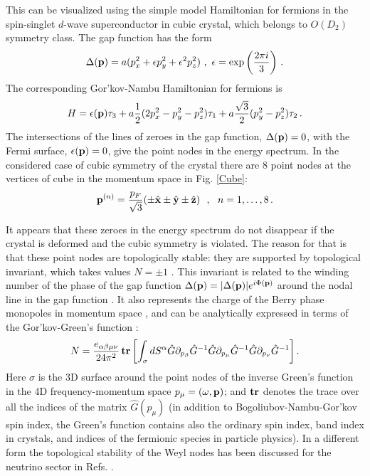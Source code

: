 \documentclass[prb,
superscriptaddress,showpacs,amsmath,amssymb]{revtex4}
\begin{document}
This can be visualized using the
simple model Hamiltonian for fermions  in the  spin-singlet $d$-wave superconductor in cubic crystal, which belongs to $O(D_2)$ symmetry class. The gap function has the form
 \begin{equation}
\Delta({\bf p})= a(p_x^2 +\epsilon p_y^2 +\epsilon^2 p_z^2) \,\,,
 \,\,\epsilon=\exp\left(\frac{2\pi i}{3} \right)\,.
\label{OD2}
\end{equation}
The corresponding Gor'kov-Nambu Hamiltonian for fermions is
 \begin{equation}
 H=\epsilon({\bf p})\tau_3 +  a\frac{1}{2}(2p_x^2 -p_y^2-p_z^2)\tau_1 + a\frac{\sqrt{3}}{2}(p_y^2-p_z^2)\tau_2 \,.
\label{Hamiltonian}
\end{equation}
The intersections of the lines of zeroes in the gap function, $\Delta({\bf p})=0$, with the Fermi surface, $\epsilon({\bf p})=0$, give the point nodes in the energy spectrum. In the considered case of cubic symmetry of the crystal there are  8 point nodes at the vertices of cube in the momentum space in Fig. \ref{Cube}:
 \begin{equation}
{\bf p}^{(n)}=\frac{p_F}{\sqrt{3}}( \pm \hat{\bf x} \pm \hat{\bf y}   \pm \hat{\bf z} )~~,~~n=1, \ldots,8\,.
\label{Nodes}
\end{equation}

It appears that these zeroes in the energy spectrum do not disappear if the crystal is deformed and the cubic symmetry is violated. The reason for that is that these point nodes are topologically stable: they are supported by topological invariant, which takes values $N=\pm 1$ \cite{VolovikGorkov1985}. This invariant is related to the winding number of the phase of the gap function $\Delta({\bf p})=|\Delta({\bf p})|e^{i\Phi({\bf p})}$ around the nodal line in the gap function \cite{VolovikMineev1982}. It also represents the charge of the Berry phase monopoles in momentum space \cite{Volovik1987}, 
and can be analytically expressed in terms of the Gor'kov-Green's function \cite{GrinevichVolovik1988}: 
\begin{equation}
N= \frac{e_{\alpha\beta\mu\nu}}{24\pi^2} \,
{\bf tr}\left[ \int_\sigma   dS^\alpha
 \hat G\partial_{p_\beta}  \hat G^{-1}
 \hat G\partial_{p_\mu}  \hat G^{-1}  \hat G\partial_{p_\nu}   \hat G^{-1}\right].
\label{N3}
\end{equation}
Here $\sigma$ is the 3D surface around  the point nodes of the inverse Green's function in the 4D  frequency-momentum space
$p_\mu=(\omega,{\bf p})$; and ${\bf tr}$ denotes the trace over all the indices of the matrix  $\hat G(p_\mu)$ (in addition to Bogoliubov-Nambu-Gor'kov spin index, the Green's function contains also the ordinary spin index, band index in crystals, and indices of the fermionic species in particle physics). 
In a different form the topological stability of the Weyl nodes has been discussed for the neutrino sector in Refs. \cite{NielsenNinomiya1981a,NielsenNinomiya1981b}.
\end{document}

